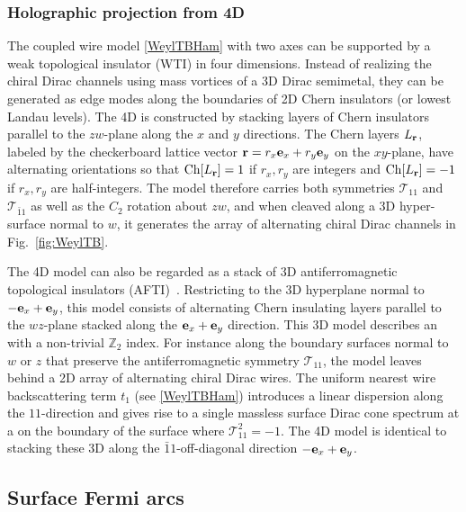 \subsubsection{Holographic projection from 4D}\label{sec:holproj4D}
The coupled wire model \eqref{WeylTBHam} with two \AFTR axes can be supported by a weak topological insulator (\hypertarget{WTI}{WTI}) in four dimensions. Instead of realizing the chiral Dirac channels using mass vortices of a 3D Dirac semimetal, they can be generated as edge modes along the boundaries of 2D Chern insulators (or lowest Landau levels). The 4D \WTI is constructed by stacking layers of Chern insulators parallel to the $zw$-plane along the $x$ and $y$ directions. The Chern layers $L_{\bf r}$, labeled by the checkerboard lattice vector ${\bf r}=r_x{\bf e}_x+r_y{\bf e}_y$ on the $xy$-plane, have alternating orientations so that $\mathrm{Ch}[L_{\bf r}]=1$ if $r_x,r_y$ are integers and $\mathrm{Ch}[L_{\bf r}]=-1$ if $r_x,r_y$ are half-integers.  The model therefore carries both \AFTR symmetries $\mathcal{T}_{11}$ and $\mathcal{T}_{\bar{1}1}$ as well as the $C_2$ rotation about $zw$, and when cleaved along a 3D hyper-surface normal to $w$, it generates the array of alternating chiral Dirac channels in Fig.~\ref{fig:WeylTB}.

The 4D \WTI model can also be regarded as a stack of 3D antiferromagnetic topological insulators (\hypertarget{AFTI}{AFTI})~\cite{MongEssinMoore10}. Restricting to the 3D hyperplane normal to $-{\bf e}_x+{\bf e}_y$, this model consists of alternating Chern insulating layers parallel to the $wz$-plane stacked along the ${\bf e}_x+{\bf e}_y$ direction. This 3D model describes an \AFTI with a non-trivial $\mathbb{Z}_2$ index. For instance along the boundary surfaces normal to $w$ or $z$ that preserve the antiferromagnetic symmetry $\mathcal{T}_{11}$, the model leaves behind a 2D array of alternating chiral Dirac wires. The uniform nearest wire backscattering term $t_1$ (see \eqref{WeylTBHam}) introduces a linear dispersion along the $11$-direction and gives rise to a single massless surface Dirac cone spectrum at a \TRIM on the boundary of the surface \BZ where $\mathcal{T}_{11}^2=-1$. The 4D \WTI model is identical to stacking these 3D \AFTI along the $\bar{1}1$-off-diagonal direction $-{\bf e}_x+{\bf e}_y$. 

\subsection{Surface Fermi arcs}\label{sec:fermiarc1}

